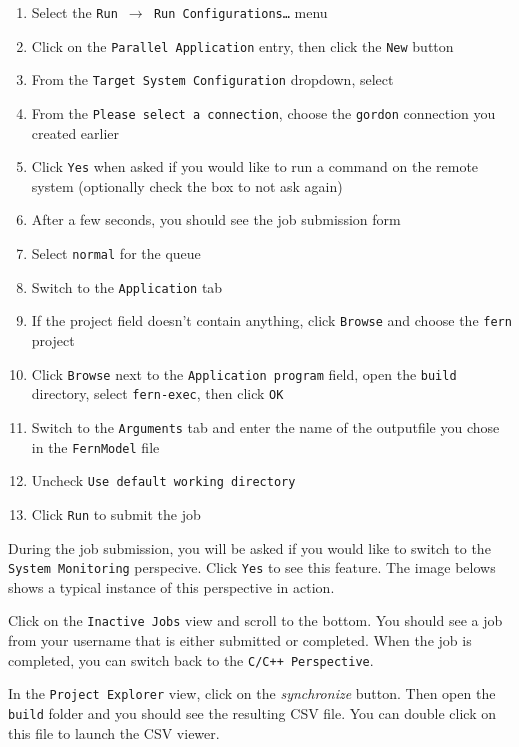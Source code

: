 \begin{enumerate}
  \item Select the \texttt{Run $\rightarrow$ Run Configurations\ldots} menu
  \item Click on the \texttt{Parallel Application} entry, then click the
  \texttt{New} button
  \item From the \texttt{Target System Configuration} dropdown, select
  \item From the \texttt{Please select a connection}, choose the \texttt{gordon}
  connection you created earlier
  \item Click \texttt{Yes} when asked if you would like to run a command on the
  remote system (optionally check the box to not ask again)
  \item After a few seconds, you should see the job submission form
  \item Select \texttt{normal} for the queue
  \item Switch to the \texttt{Application} tab
  \item If the project field doesn't contain anything, click \texttt{Browse} and
  choose the \texttt{fern} project
  \item Click \texttt{Browse} next to the \texttt{Application program} field,
  open the \texttt{build} directory, select \texttt{fern-exec}, then click
  \texttt{OK}
  \item Switch to the \texttt{Arguments} tab and enter the name of the
  outputfile you chose in the \texttt{FernModel} file
  \item Uncheck \texttt{Use default working directory}
  \item Click \texttt{Run} to submit the job 
\end{enumerate}

During the job submission, you will be asked if you would like to switch to the
\texttt{System Monitoring} perspecive. Click \texttt{Yes} to see this feature.
The image belows shows a typical instance of this perspective in action.

Click on the \texttt{Inactive Jobs} view and scroll to the bottom. You should
see a job from your username that is either submitted or completed. When the job
is completed, you can switch back to the \texttt{C/C++ Perspective}.

In the \texttt{Project Explorer} view, click on the \textit{synchronize}
button. Then open the \texttt{build} folder and you should see the resulting
CSV file. You can double click on this file to launch the CSV viewer.

